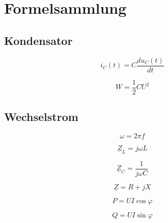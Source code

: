 \documentclass[a4paper,12pt]{article}
\begin{document}
\newpage

\section*{Formelsammlung}

\subsection*{Kondensator}

\[
i_C(t) = C \frac{du_C(t)}{dt}
\]

\[
W = \frac{1}{2} C U^2
\]

\subsection*{Wechselstrom}

\[
\omega = 2 \pi f
\]

\[
\underline{Z}_L = j \omega L
\]

\[
\underline{Z}_C = \frac{1}{j \omega C}
\]

\[
\underline{Z} = R + jX
\]

\[
P = U I \cos \varphi
\]

\[
Q = U I \sin \varphi
\]
\end{document}
